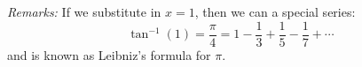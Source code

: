 \begin{itemize}
\begin{example}
        \textit{Remarks:} If we substitute in $x=1$, then we can a special series:
        \begin{equation}
            \tan^{-1}(1) = \frac{\pi}{4} = 1-\frac{1}{3}+\frac{1}{5}-\frac{1}{7}+\cdots 
        \end{equation}
        and is known as Leibniz's formula for $\pi$.
    \end{example}
\end{itemize}